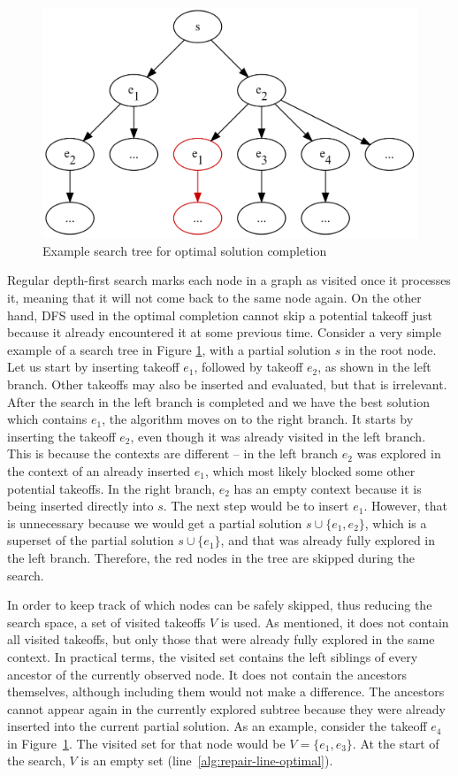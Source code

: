 \begin{figure}[htb]
    \centering
    \includegraphics[width=0.85\linewidth]{img/DFS-graph.png}
    \caption{Example search tree for optimal solution completion}
    \label{fig:dfs-graph}
\end{figure}

Regular depth-first search marks each node in a graph as visited once it processes it, meaning that it will not come back to the same node again.
On the other hand, DFS used in the optimal completion cannot skip a potential takeoff just because it already encountered it at some previous time.
Consider a very simple example of a search tree in Figure \ref{fig:dfs-graph}, with a partial solution $s$ in the root node.
Let us start by inserting takeoff $e_1$, followed by takeoff $e_2$, as shown in the left branch.
Other takeoffs may also be inserted and evaluated, but that is irrelevant.
After the search in the left branch is completed and we have the best solution which contains $e_1$, the algorithm moves on to the right branch.
It starts by inserting the takeoff $e_2$, even though it was already visited in the left branch.
This is because the contexts are different -- in the left branch $e_2$ was explored in the context of an already inserted $e_1$, which most likely blocked some other potential takeoffs.
In the right branch, $e_2$ has an empty context because it is being inserted directly into $s$.
The next step would be to insert $e_1$.
However, that is unnecessary because we would get a partial solution $s \cup \{ e_1, e_2 \}$, which is a superset of the partial solution $s \cup \{ e_1 \}$, and that was already fully explored in the left branch.
Therefore, the red nodes in the tree are skipped during the search.

In order to keep track of which nodes can be safely skipped, thus reducing the search space, a set of visited takeoffs $V$ is used.
As mentioned, it does not contain all visited takeoffs, but only those that were already fully explored in the same context.
In practical terms, the visited set contains the left siblings of every ancestor of the currently observed node.
It does not contain the ancestors themselves, although including them would not make a difference. 
The ancestors cannot appear again in the currently explored subtree because they were already inserted into the current partial solution.
As an example, consider the takeoff $e_4$ in Figure~\ref{fig:dfs-graph}.
The visited set for that node would be $V = \{ e_1, e_3 \}$.
At the start of the search, $V$ is an empty set (line~\ref{alg:repair-line-optimal}).

